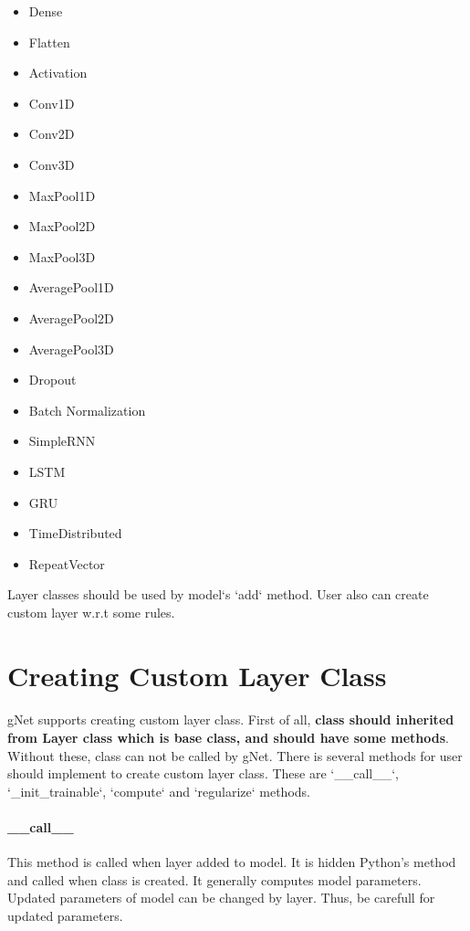 \documentclass[12pt]{report}
\begin{document}
\begin{itemize}
	\item Dense
	\item Flatten
	\item Activation
	\item Conv1D
	\item Conv2D
	\item Conv3D
	\item MaxPool1D
	\item MaxPool2D
	\item MaxPool3D
	\item AveragePool1D
	\item AveragePool2D
	\item AveragePool3D
	\item Dropout
	\item Batch Normalization
	\item SimpleRNN
	\item LSTM
	\item GRU
	\item TimeDistributed
	\item RepeatVector
\end{itemize}

Layer classes should be used by model`s `add` method. User also can create custom layer w.r.t some rules. 



\section{Creating Custom Layer Class}

\paragraph{}
gNet supports creating custom layer class. First of all, \textbf{class should inherited from Layer class which is base class, and should have some methods}. Without these, class can not be called by gNet. There is several methods for user should implement to create custom layer class. These are `\_\_call\_\_`, `\_init\_trainable`, `compute` and `regularize` methods. 

\paragraph{\_\_call\_\_}
This method is called when layer added to model. It is hidden Python's method and called when class is created. It generally computes model parameters. Updated parameters of model can be changed by layer. Thus, be carefull
for updated parameters. 
\end{document}
